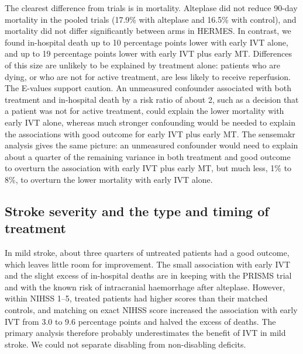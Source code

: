 The clearest difference from trials is in mortality. Alteplase did not reduce 90-day mortality in the pooled trials (17.9\% with alteplase and 16.5\% with control)\cite{emberson_effect_2014}, and mortality did not differ significantly between arms in HERMES\cite{goyal_endovascular_2016}. In contrast, we found in-hospital death up to 10 percentage points lower with early IVT alone, and up to 19 percentage points lower with early IVT plus early MT. Differences of this size are unlikely to be explained by treatment alone: patients who are dying, or who are not for active treatment, are less likely to receive reperfusion. The E-values support caution. An unmeasured confounder associated with both treatment and in-hospital death by a risk ratio of about 2, such as a decision that a patient was not for active treatment, could explain the lower mortality with early IVT alone, whereas much stronger confounding would be needed to explain the associations with good outcome for early IVT plus early MT. The sensemakr analysis gives the same picture: an unmeasured confounder would need to explain about a quarter of the remaining variance in both treatment and good outcome to overturn the association with early IVT plus early MT, but much less, 1\% to 8\%, to overturn the lower mortality with early IVT alone.

\subsection{Stroke severity and the type and timing of treatment}

In mild stroke, about three quarters of untreated patients had a good outcome, which leaves little room for improvement. The small association with early IVT and the slight excess of in-hospital deaths are in keeping with the PRISMS trial\cite{khatri_effect_2018} and with the known risk of intracranial haemorrhage after alteplase\cite{emberson_effect_2014}. However, within NIHSS 1--5, treated patients had higher scores than their matched controls, and matching on exact NIHSS score increased the association with early IVT from 3.0 to 9.6 percentage points and halved the excess of deaths. The primary analysis therefore probably underestimates the benefit of IVT in mild stroke. We could not separate disabling from non-disabling deficits.

